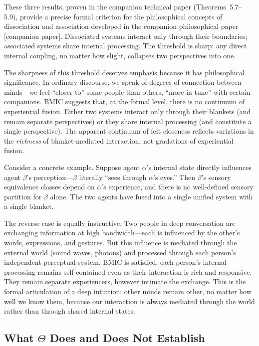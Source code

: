 \documentclass[11pt,a4paper]{article}
\theoremstyle{definition}
\theoremstyle{plain}
\theoremstyle{remark}
\begin{document}
These three results, proven in the companion technical paper (Theorems~5.7--5.9), provide a precise formal criterion for the philosophical concepts of dissociation and association developed in the companion philosophical paper [companion paper]. Dissociated systems interact only through their boundaries; associated systems share internal processing. The threshold is sharp: any direct internal coupling, no matter how slight, collapses two perspectives into one.

The sharpness of this threshold deserves emphasis because it has philosophical significance. In ordinary discourse, we speak of degrees of connection between minds---we feel ``closer to'' some people than others, ``more in tune'' with certain companions. BMIC suggests that, at the formal level, there is no continuum of experiential fusion. Either two systems interact only through their blankets (and remain separate perspectives) or they share internal processing (and constitute a single perspective). The apparent continuum of felt closeness reflects variations in the \textit{richness} of blanket-mediated interaction, not gradations of experiential fusion.

Consider a concrete example. Suppose agent $\alpha$'s internal state directly influences agent $\beta$'s perception---$\beta$ literally ``sees through $\alpha$'s eyes.'' Then $\beta$'s sensory equivalence classes depend on $\alpha$'s experience, and there is no well-defined sensory partition for $\beta$ alone. The two agents have fused into a single unified system with a single blanket.

The reverse case is equally instructive. Two people in deep conversation are exchanging information at high bandwidth---each is influenced by the other's words, expressions, and gestures. But this influence is mediated through the external world (sound waves, photons) and processed through each person's independent perceptual system. BMIC is satisfied: each person's internal processing remains self-contained even as their interaction is rich and responsive. They remain separate experiencers, however intimate the exchange. This is the formal articulation of a deep intuition: other minds remain other, no matter how well we know them, because our interaction is always mediated through the world rather than through shared internal states.

\subsection{What $\Theta$ Does and Does Not Establish}\label{sec:theta-scope}
\end{document}
